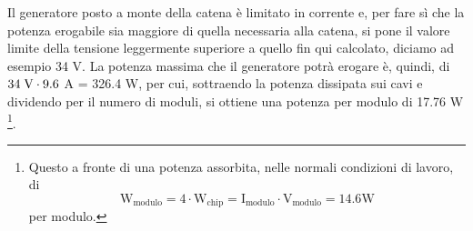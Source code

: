 Il generatore posto a monte della catena è limitato in corrente e, per fare sì che la potenza erogabile sia maggiore di quella necessaria alla catena, si pone il valore limite della tensione leggermente superiore a quello fin qui calcolato, diciamo ad esempio 34 V.
La potenza massima che il generatore potrà erogare è, quindi, di $34 \rm \; V \cdot 9.6$ A = 326.4 W, per cui, sottraendo la potenza dissipata sui cavi e dividendo per il numero di moduli, si ottiene una potenza per modulo di 17.76 W
\footnote{
  Questo a fronte di una potenza assorbita, nelle normali condizioni di lavoro, di
  \begin{equation*}
    \mathrm{W_{modulo} = 4 \cdot W_{chip} = I_{modulo} \cdot V_{modulo} = 14.6 W}
  \end{equation*}
  per modulo.
}.

